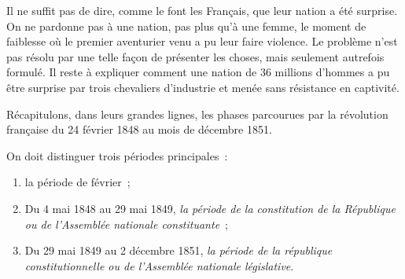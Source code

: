 \documentclass[french,twoside]{book} %
\begin{document}
Il ne suffit pas de dire, comme le font les Français, que leur nation a été surprise. On ne pardonne pas à une nation, pas plus qu’à une femme, le moment de faiblesse où le premier aventurier venu a pu leur faire violence. Le problème n’est pas résolu par une telle façon de présenter les choses, mais seulement autrefois formulé. Il reste à expliquer comment une nation de 36 millions d’hommes a pu être surprise par trois chevaliers d’industrie et menée sans résistance en captivité.\par
Récapitulons, dans leurs grandes lignes, les phases parcourues par la révolution française du 24 février 1848 au mois de décembre 1851.\par
On doit distinguer trois périodes principales :\par

\begin{enumerate}[itemsep=0pt,]
\item la période de février ;
\item Du 4 mai 1848 au 29 mai 1849, \emph{la période de la constitution de la République ou de l’Assemblée nationale constituante} ;
\item Du 29 mai 1849 au 2 décembre 1851, \emph{la période de la république constitutionnelle ou de l’Assemblée nationale législative}.
\end{enumerate}
\end{document}
